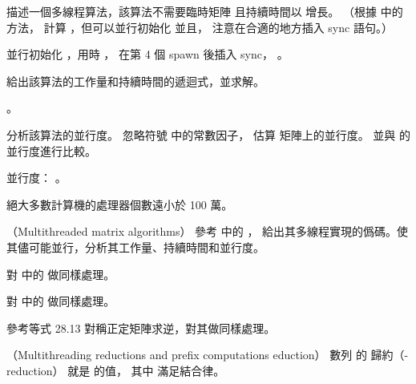 \startigBase[a]\startitem
描述一個多線程算法，該算法不需要臨時矩陣  且持續時間以  增長。
（\hint 根據  中的方法，
計算 ，但可以並行初始化  並且，
注意在合適的地方插入 sync 語句。）
\stopitem\stopigBase

\startANSWER
並行初始化 ，用時 ，
在第 4 個 spawn  後插入 sync，
 。
\stopANSWER

\startigBase[continue]\startitem
給出該算法的工作量和持續時間的遞迴式，並求解。
\stopitem\stopigBase

\startANSWER
{}。
\stopANSWER

\startigBase[continue]\startitem
分析該算法的並行度。
忽略符號 \m{\Theta} 中的常數因子，
估算  矩陣上的並行度。
並與  的並行度進行比較。
\stopitem\stopigBase

\startANSWER
並行度： 。

絕大多數計算機的處理器個數遠小於 100 萬。
\stopANSWER
\stopPROBLEM

\startPROBLEM
（Multithreaded matrix algorithms）
\startigBase[a]\startitem
參考 中的 ，
給出其多線程實現的僞碼。使其儘可能並行，分析其工作量、持續時間和並行度。
\stopitem\stopigBase

\startANSWER
{}
\stopANSWER

\startigBase[continue]\startitem
對 中的  做同樣處理。
\stopitem\stopigBase
\stopPROBLEM

\startANSWER
{}
\stopANSWER

\startigBase[continue]\startitem
對 中的  做同樣處理。
\stopitem\stopigBase

\startANSWER
{}
\stopANSWER

\startigBase[continue]\startitem
參考等式 28.13 對稱正定矩陣求逆，對其做同樣處理。
\stopitem\stopigBase

\startANSWER
{}
\stopANSWER
\stopPROBLEM

\startPROBLEM
（Multithreading reductions and prefix computations eduction）
數列  的 \m{\otimes} {\EMP 歸約}（\m{\otimes}-reduction）
就是  的值，
其中 \m{\otimes} 滿足結合律。

